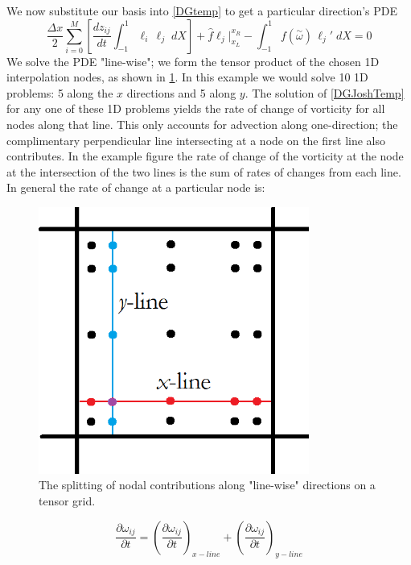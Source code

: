 \documentclass[letterpaper,12pt]{report}
\newcommand{\be}{\begin{equation}}
\newcommand{\ben}[1]{\begin{equation}\label{#1}}
\newcommand{\ee}{\end{equation}}
\newcommand{\aomega}{\overset{\sim}{\omega}}				%
\begin{document}
We now substitute our basis into \eqref{DGtemp} to get a particular direction's PDE
\ben{DGJoshTemp} \frac{\Delta x}{2}	\sum_{i=0}^M \left[ \frac{d z_{ij}}{dt}	\int_{-1}^{1}\ell_i  \, \ell_j \;dX \right]
+\hat{f}\ell_j \Big|^{x_R}_{x_L} 
- \int_{-1}^{1} f(\aomega) \, \ell_j' \;dX = 0 \ee
We solve the PDE "line-wise"; we form the tensor product of the chosen 1D interpolation nodes, as shown in \ref{fig:DGtensorSplit}. In this example we would solve 10 1D problems: 5 along the $x$ directions and 5 along $y$. The solution of \eqref{DGJoshTemp} for any one of these 1D problems yields the rate of change of vorticity for all nodes along that line. This only accounts for advection along one-direction; the complimentary perpendicular line intersecting at a node on the first line also contributes. In the example figure the rate of change of the vorticity at the node at the intersection of the two lines is the sum of rates of changes from each line. In general the rate of change at a particular node is:

\begin{figure}
\centering
\includegraphics[width=3.5in]{lineDGelemDiag.PNG}
\caption{\label{fig:DGtensorSplit}The splitting of nodal contributions along "line-wise" directions on a tensor grid.}
\end{figure}

\be \frac{\partial \omega_{ij}}{\partial t} = (\frac{\partial \omega_{ij}}{\partial t})_{x-line} + (\frac{\partial \omega_{ij}}{\partial t})_{y-line} \ee

%
\end{document}
